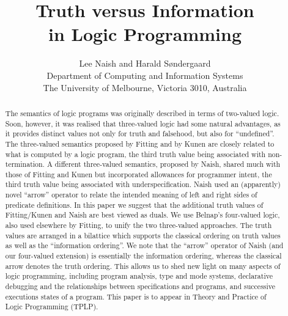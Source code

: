 \documentclass{tlp}
\begin{document}
\title[Truth versus Information]{Truth versus Information \\ in Logic Programming}

\author[L. Naish and H. S{\o}ndergaard]{
Lee Naish and Harald S{\o}ndergaard\\
Department of Computing and Information Systems \\
The University of Melbourne, Victoria 3010,
Australia\\
}


\maketitle


\begin{abstract}

The semantics of logic programs was originally described in terms
of two-valued logic.
Soon, however, it was realised that three-valued logic had some
natural advantages, as it provides distinct values not
only for truth and falsehood, but also for ``undefined''.
The three-valued semantics proposed by Fitting and by Kunen are
closely related to what is computed by a logic program, the third truth
value being associated with non-termination.  
A different three-valued semantics, proposed by Naish, shared much 
with those of Fitting and Kunen but incorporated allowances for
programmer intent, the third truth value being associated with 
underspecification.
Naish used an (apparently) novel ``arrow'' operator to relate the intended
meaning of left and right sides of predicate definitions.  In this paper
we suggest that the additional truth values of Fitting/Kunen and 
Naish are best viewed as duals.  
We use Belnap's four-valued logic, also used elsewhere by Fitting, to unify
the two three-valued approaches.
The truth values are arranged in a bilattice which
supports the classical ordering on truth values as well as the
``information ordering''.
We note that the ``arrow'' operator of Naish
(and our four-valued extension) is essentially the information ordering,
whereas the classical arrow denotes the truth ordering.
This allows us to shed new light on many aspects of logic programming,
including program analysis, type and mode systems, declarative debugging and
the relationships between specifications and
programs, and successive executions states of a program.
This paper is to appear
in Theory and Practice of Logic Programming (TPLP).

\end{abstract}
\end{document}
